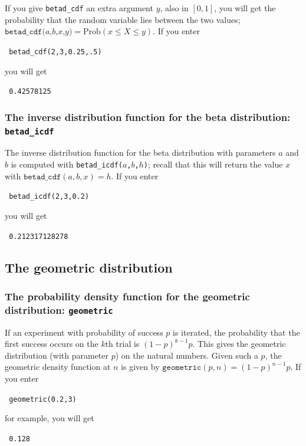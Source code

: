 \documentclass[a4paper,11pt]{book}
\begin{document}
If you give \texttt{betad\_cdf} an extra argument $y$, also in $[0,1]$,
you will get the probability that
the random variable lies between the two values;
$\texttt{betad\_cdf($a$,$b$,$x$,$y$)} = \text{Prob}(x \le X \le y)$.  
If you enter
\begin{center}
  \tt
  betad\_cdf(2,3,0.25,.5)
\end{center}
you will get
\begin{center}
  \tt
  0.42578125
\end{center}

\subsubsection{The inverse distribution function for the beta distribution: \texttt{betad\_icdf}}

The inverse distribution function for the beta
distribution with parameters $a$ and $b$ is computed with
\texttt{betad\_icdf($a$,$b$,$h$)}; recall that this will return the
value $x$ with $\texttt{betad\_cdf}(a,b,x) = h$.  If you enter
\begin{center}
  \tt
  betad\_icdf(2,3,0.2)
\end{center}
you will get
\begin{center}
  \tt
  0.212317128278
\end{center}

\subsection{The geometric distribution}

\subsubsection{The probability density function for the geometric
distribution: \texttt{geometric}}

If an experiment with probability of success $p$ is iterated, the
probability that the first success occurs on the $k$th trial is
$(1-p)^{k-1}p$.  This gives the geometric distribution (with parameter
$p$) on the natural numbers.  Given such a $p$, the geometric density
function at $n$ is given by $\texttt{geometric}(p,n) = (1-p)^{n-1}p$.
If you enter
\begin{center}
  \tt
  geometric(0.2,3)
\end{center}
for example, you will get
\begin{center}
  \tt
  0.128  
\end{center}
\end{document}

